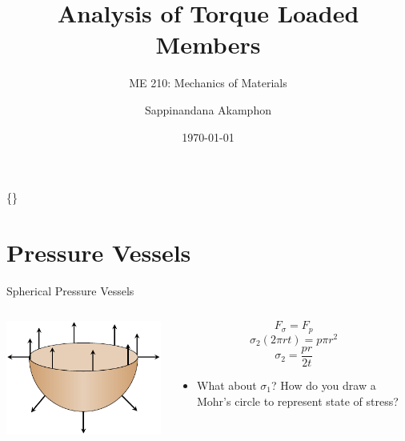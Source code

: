 \documentclass[10pt, svgnames]{beamer}
\author{Sappinandana Akamphon}
\date{\today}
\title{Analysis of Torque Loaded Members}
\subtitle{ME 210: Mechanics of Materials}
\institute{Department of Mechanical Engineering, TSE}
\date{}
\begin{document}
\begin{frame}[label={sec:org4d5ad47}]{\{\}}
\maketitle
\end{frame}

\section{Pressure Vessels}
\label{sec:org27901e0}

\begin{frame}[label={sec:org7c3bbd5}]{Spherical Pressure Vessels}
\begin{columns}
\begin{column}{0.5\columnwidth}
\begin{center}
\includegraphics[height=0.4\textheight]{pictures/sphere-pressure-vessel.pdf}
\end{center}
\end{column}

\begin{column}{0.5\columnwidth}
$$ F_{\sigma} = F_p $$
$$ \sigma_2 \left( 2\pi r t \right) = p \pi r^2 $$
$$ \sigma_2 = \frac{pr}{2t} $$

\begin{itemize}
\item What about \(\sigma_1\)? How do you draw a Mohr's circle to represent state of stress?
\end{itemize}
\end{column}
\end{columns}
\end{frame}
\end{document}
